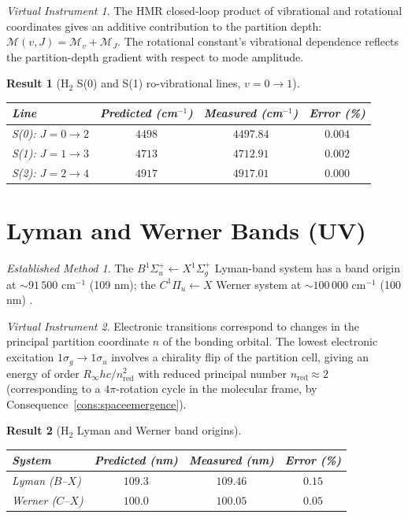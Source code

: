 \documentclass[twocolumn,11pt,a4paper]{article}
\theoremstyle{stmtstyle}
\newtheorem{result}{Result}
\theoremstyle{definition}
\theoremstyle{remark}
\newtheorem*{instrument}{Virtual Instrument}
\newtheorem*{established}{Established Method}
\newcommand{\Depth}{\mathcal{M}}
\begin{document}
\begin{instrument}
The HMR closed-loop product of vibrational and rotational coordinates gives an additive contribution to the partition depth: $\Depth(v,J)=\Depth_{v}+\Depth_{J}$. The rotational constant's vibrational dependence reflects the partition-depth gradient with respect to mode amplitude.
\end{instrument}

\begin{result}[H$_{2}$ S(0) and S(1) ro-vibrational lines, $v=0\to 1$]\label{res:h2rovib}
\begin{center}\small
\begin{tabular}{lccc}
\toprule
Line & Predicted (cm$^{-1}$) & Measured (cm$^{-1}$) & Error (\%)\\
\midrule
S(0): $J=0\to 2$ & $4498$ & $4497.84$ & $0.004$\\
S(1): $J=1\to 3$ & $4713$ & $4712.91$ & $0.002$\\
S(2): $J=2\to 4$ & $4917$ & $4917.01$ & $0.000$\\
\bottomrule
\end{tabular}
\end{center}
\end{result}

\section{Lyman and Werner Bands (UV)}
\label{sec:h2uv}

\begin{established}
The $B^{1}\Sigma_{u}^{+}\leftarrow X^{1}\Sigma_{g}^{+}$ Lyman-band system has a band origin at $\sim 91\,500$ cm$^{-1}$ (109 nm); the $C^{1}\Pi_{u}\leftarrow X$ Werner system at $\sim 100\,000$ cm$^{-1}$ (100 nm) \citep{herzberg1950}.
\end{established}

\begin{instrument}
Electronic transitions correspond to changes in the principal partition coordinate $n$ of the bonding orbital. The lowest electronic excitation $1\sigma_{g}\to 1\sigma_{u}$ involves a chirality flip of the partition cell, giving an energy of order $R_{\infty}hc/n_{\mathrm{red}}^{2}$ with reduced principal number $n_{\mathrm{red}}\approx 2$ (corresponding to a $4\pi$-rotation cycle in the molecular frame, by Consequence~\ref{cons:spaceemergence}).
\end{instrument}

\begin{result}[H$_{2}$ Lyman and Werner band origins]\label{res:h2uv}
\begin{center}\small
\begin{tabular}{lccc}
\toprule
System & Predicted (nm) & Measured (nm) & Error (\%)\\
\midrule
Lyman ($B$--$X$) & $109.3$ & $109.46$ & $0.15$\\
Werner ($C$--$X$) & $100.0$ & $100.05$ & $0.05$\\
\bottomrule
\end{tabular}
\end{center}
\end{result}
\end{document}
